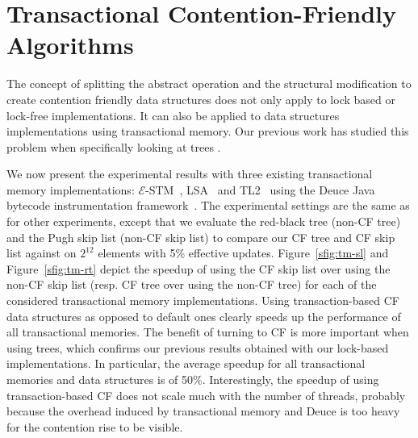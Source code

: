 % 



\section{Transactional Contention-Friendly Algorithms}\label{sec:tm} 


The concept of splitting the abstract operation and the structural modification to create contention friendly data structures
does not only apply to lock based or lock-free implementations.
It can also be applied to data structures implementations using transactional memory.
Our previous work has studied this problem when specifically looking at trees \cite{CGR12}.

We now present the experimental results with three existing transactional memory implementations:
${\mathcal E}$-STM~\cite{FGG09}, LSA~\cite{RFF06} and TL2~\cite{DSS06} using the Deuce Java bytecode instrumentation framework~\cite{KSF10}.
The experimental settings are the same as for other experiments, except that we evaluate the red-black tree (non-CF tree) and the Pugh skip list (non-CF skip list) to compare our CF tree and CF skip list against on $2^{12}$ elements with 5\% effective updates.
Figure~\ref{sfig:tm-sl} and Figure~\ref{sfig:tm-rt}  depict the speedup of using the CF skip list over using the non-CF skip list (resp. CF tree over using the non-CF tree)
for each of the considered transactional memory implementations.
Using transaction-based CF data structures as opposed to default ones clearly speeds up the performance of all transactional memories. The benefit of turning to CF is more important when using trees, which confirms our previous results obtained with our lock-based implementations. In particular, the average speedup for all transactional memories and data structures is of 50\%.
Interestingly, the speedup of using transaction-based CF does not scale much with the number of threads, probably because the overhead induced by transactional memory and Deuce is too heavy for the contention rise to be visible.

